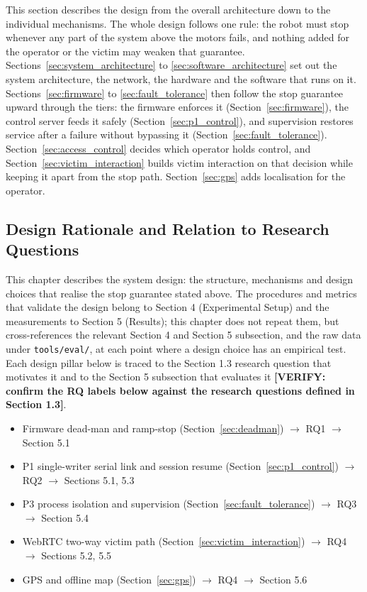 This section describes the design from the overall architecture down to the individual mechanisms. The whole design follows one rule: the robot must stop whenever any part of the system above the motors fails, and nothing added for the operator or the victim may weaken that guarantee. Sections~\ref{sec:system_architecture} to \ref{sec:software_architecture} set out the system architecture, the network, the hardware and the software that runs on it. Sections~\ref{sec:firmware} to \ref{sec:fault_tolerance} then follow the stop guarantee upward through the tiers: the firmware enforces it (Section~\ref{sec:firmware}), the control server feeds it safely (Section~\ref{sec:p1_control}), and supervision restores service after a failure without bypassing it (Section~\ref{sec:fault_tolerance}). Section~\ref{sec:access_control} decides which operator holds control, and Section~\ref{sec:victim_interaction} builds victim interaction on that decision while keeping it apart from the stop path. Section~\ref{sec:gps} adds localisation for the operator.

\subsection{Design Rationale and Relation to Research Questions}
\label{sec:design_rationale}

This chapter describes the system design: the structure, mechanisms and design choices that realise the stop guarantee stated above. The procedures and metrics that validate the design belong to Section 4 (Experimental Setup) and the measurements to Section 5 (Results); this chapter does not repeat them, but cross-references the relevant Section 4 and Section 5 subsection, and the raw data under \texttt{tools/eval/}, at each point where a design choice has an empirical test. Each design pillar below is traced to the Section 1.3 research question that motivates it and to the Section 5 subsection that evaluates it \textbf{[VERIFY: confirm the RQ labels below against the research questions defined in Section 1.3]}.

\begin{itemize}
\item Firmware dead-man and ramp-stop (Section~\ref{sec:deadman}) $\rightarrow$ RQ1 $\rightarrow$ Section 5.1
\item P1 single-writer serial link and session resume (Section~\ref{sec:p1_control}) $\rightarrow$ RQ2 $\rightarrow$ Sections 5.1, 5.3
\item P3 process isolation and supervision (Section~\ref{sec:fault_tolerance}) $\rightarrow$ RQ3 $\rightarrow$ Section 5.4
\item WebRTC two-way victim path (Section~\ref{sec:victim_interaction}) $\rightarrow$ RQ4 $\rightarrow$ Sections 5.2, 5.5
\item GPS and offline map (Section~\ref{sec:gps}) $\rightarrow$ RQ4 $\rightarrow$ Section 5.6
\end{itemize}

